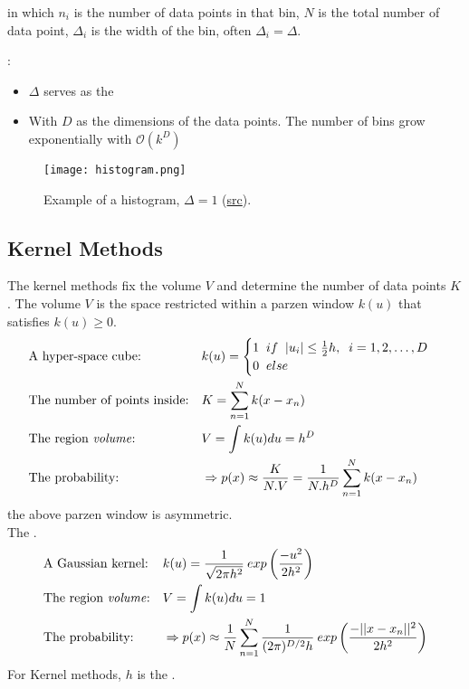 in which $n_i$ is the number of data points in that bin, $N$ is the total number of data point, $\Delta_i$ is the width of the bin, often $\Delta_i=\Delta$.

:
\begin{itemize}
	\item $\Delta$ serves as the 
	\item With $D$ as the dimensions of the data points. The number of bins grow exponentially with $\mathcal{O}(k^D)$
\end{itemize}
\begin{figure}[hbt!]
	\centering
	\texttt{[image: histogram.png]}
	\caption{Example of a histogram, $\Delta = 1$ (\href{https://en.wikipedia.org/wiki/Histogram}{src}).}
\end{figure}

\subsection{Kernel Methods}
The kernel methods fix the volume $V$ and determine the number of data points $K$. The volume $V$ is the space restricted within a parzen window $k(u)$ that satisfies $k(u) \geq 0$.
\begin{align}
	&\text{A hyper-space cube:} && k(u) = \begin{cases}
		1\;\; if \;\; |u_i| \leq \frac{1}{2}h, \;\; i = 1, 2, \dots, D \\
		0\;\; else
	\end{cases} \\
	&\text{The number of points inside:} &&K = \sum_{n=1}^{N} k(x-x_n) \\
	&\text{The region \textit{volume}:} &&V = \int k(u) du = h^D\\
	&\text{The probability:} && \Rightarrow p(x) \approx \frac{K}{N.V} = \frac{1}{N.h^D}\sum_{n=1}^{N}k(x-x_n)
\end{align}
\note the above parzen window is asymmetric.\\
The .
\begin{align}
	&\text{A Gaussian kernel:} && k(u) = \frac{1}{\sqrt{2\pi h^2}}\:exp\left(\frac{-u^2}{2h^2}\right) \\
	&\text{The region \textit{volume}:} &&V = \int k(u) du = 1 \\
	&\text{The probability:} && \Rightarrow p(x) \approx \frac{1}{N} \sum_{n=1}^{N} \frac{1}{(2\pi)^{D/2}h}\:exp\left(\frac{-||x-x_n||^2}{2h^2}\right)
\end{align}
For Kernel methods, $h$ is the .

